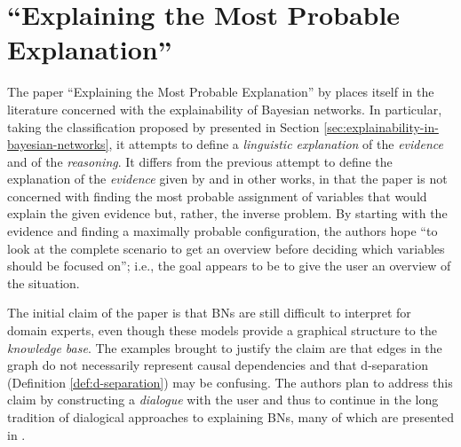 \section{\enquote{Explaining the Most Probable Explanation}} \label{sec:explaining-the-most-probable-explanation}
The paper \enquote{Explaining the Most Probable Explanation} by \citet{Butz2018} places itself in the literature concerned with the explainability of Bayesian networks.
In particular, taking the classification proposed by \citet{lacave2002review} presented in Section \ref{sec:explainability-in-bayesian-networks}, it attempts to define a \textit{linguistic explanation} of the \textit{evidence} and of the \textit{reasoning}.
It differs from the previous attempt to define the explanation of the \textit{evidence} given by \citet{lacave2002review} and in other works, in that the paper is not concerned with finding the most probable assignment of variables that would explain the given evidence but, rather, the inverse problem.
By starting with the evidence and finding a maximally probable configuration, the authors hope \enquote{to look at the complete scenario to get an overview before deciding which variables should be focused on}; i.e., the goal appears to be to give the user an overview of the situation.  

The initial claim of the paper is that BNs are still difficult to interpret for domain experts, even though these models provide a graphical structure to the \textit{knowledge base}.
The examples brought to justify the claim are that edges in the graph do not necessarily represent causal dependencies and that d-separation (Definition \ref{def:d-separation}) may be confusing.
The authors plan to address this claim by constructing a \textit{dialogue} with the user and thus to continue in the long tradition of dialogical approaches to explaining BNs, many of which are presented in \citep{lacave2002review}.

